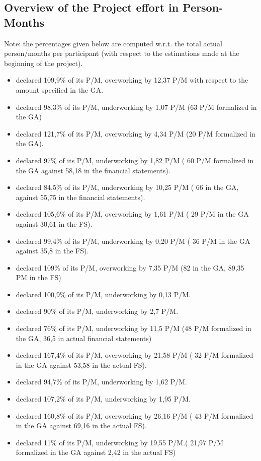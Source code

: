 \subsection{Overview of the Project effort in Person-Months}

Note: the percentages given below are computed w.r.t. the total actual
person/months per participant  (with respect to the estimations made 
at the beginning of the project).

\begin{itemize}
\item {} declared 109,9\% of its P/M, overworking by 12,37 P/M
with respect to the amount specified in the GA.
\item {} declared 98,3\% of its P/M, underworking by 1,07 P/M (63 P/M
  formalized in the GA) 
\item {} declared 121,7\% of its P/M, overworking by 4,34 P/M (20 P/M
  formalized in the GA).
\item {} declared 97\% of its P/M, underworking by 1,82 P/M ( 60 P/M 
formalized in the GA against 58,18 in the financial statements).
\item {} declared 84,5\% of its P/M, underworking by 10,25 P/M ( 66 in the
 GA, against 55,75 in the financial statements).
\item {} declared 105,6\% of its P/M, overworking by 1,61 P/M ( 29 P/M 
in the GA against 30,61 in the FS).
\item {} declared 99,4\% of its P/M, underworking by 0,20 P/M ( 36 P/M 
in the GA against 35,8 in the FS).
\item {} declared 109\% of its P/M, overworking by 7,35 P/M (82 in the GA,
 89,35 PM in the FS)
\item {} declared 100,9\% of its P/M, underworking by 0,13 P/M.
\item {} declared 90\% of its P/M, underworking by 2,7 P/M.
\item {} declared 76\% of its P/M, underworking by 11,5 P/M (48 P/M
formalized in the GA, 36,5 in actual financial statements)
\item {} declared 167,4\% of its P/M, overworking by 21,58 P/M ( 32 P/M
formalized in the GA against 53,58 in the actual FS).
\item {} declared 94,7\% of its P/M, underworking by 1,62 P/M.
\item {} declared 107,2\% of its P/M, underworking by 1,95 P/M.
\item {} declared 160,8\% of its P/M, overworking by 26,16 P/M ( 43 P/M
formalized in the GA against 69,16 in the actual FS).
\item {} declared 11\% of its P/M, underworking by 19,55 P/M.( 21,97 P/M
formalized in the GA against 2,42 in the actual FS)

\end{itemize}




